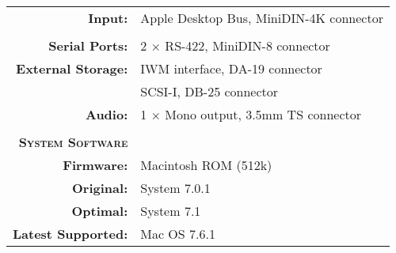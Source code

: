 \begin{tabular}{ r p{6in} }
\textbf{Input:} & Apple Desktop Bus, MiniDIN-4K connector \\
\\
\textbf{Serial Ports:} & 2 \(\times\) RS-422, MiniDIN-8 connector \\
\textbf{External Storage:} & IWM interface, DA-19 connector \\
~ & SCSI-I, DB-25 connector \\
\textbf{Audio:} & 1 \(\times\) Mono output, 3.5mm TS connector \\
\\
\textbf{\textsc{System Software}} & ~ \\
\textbf{Firmware:} & Macintosh ROM (512k) \\
\textbf{Original:} & System 7.0.1 \\
\textbf{Optimal:} & System 7.1 \\
\textbf{Latest Supported:} & Mac OS 7.6.1 \\
\end{tabular}
